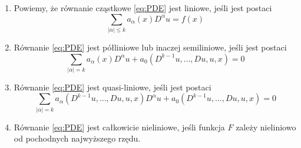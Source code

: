 \begin{definicja}\cite[s. 18]{evans}
    \begin{enumerate}[label=(\roman*)]
        \item Powiemy, że równanie cząstkowe \eqref{eq:PDE} jest liniowe, jeśli jest postaci
            \begin{equation*}
                \sum_{|\alpha |\leq k} a_{\alpha}(x)D^\alpha u = f(x)
            \end{equation*}
        \item  Równanie \eqref{eq:PDE} jest półliniowe lub inaczej semiliniowe, jeśli jest postaci
            \begin{equation*}
                \sum_{|\alpha|=k} a_\alpha (x) D^\alpha u + a_0 (D^{k-1} u, \dots, Du, u, x) = 0
            \end{equation*}
        \item Równanie \eqref{eq:PDE} jest quasi-liniowe, jeśli jest postaci
            \begin{equation*}
                \sum_{|\alpha | = k} a_\alpha (D^{k-1} u, \dots, Du, u, x) D^\alpha u + a_0 (D^{k-1}
                u, \dots, Du, u, x) = 0
            \end{equation*}
        \item Równanie \eqref{eq:PDE} jest całkowicie nieliniowe, jeśli funkcja \(F\) zależy
            nieliniowo od pochodnych najwyższego rzędu.
    \end{enumerate}
\end{definicja}

